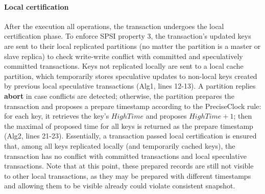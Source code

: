 \paragraph{Local certification} After the execution all operations, the transaction undergoes the local certification phase. To enforce SPSI property 3, the transaction's updated keys are sent to their local replicated partitions (no matter the partition is a master or slave replica) to check write-write conflict with committed and speculatively committed transactions. Keys not replicated locally are sent to a local cache partition, which temporarily stores speculative updates to non-local keys created by previous local speculative transactions (Alg1, lines 12-13). A partition replies \textbf{abort} in case conflicts are detected; otherwise, the partition prepares the transaction and proposes a prepare timestamp according to the PreciseClock rule: for each key, it retrieves the key's $HighTime$ and proposes $HighTime+1$; then the maximal of proposed time for all keys is returned as the prepare timestamp (Alg2, lines 21-23). Essentially, a transaction passed local certification is ensured that, among all keys replicated locally (and temporarily cached keys), the transaction has no conflict with committed transactions and local speculative transactions. Note that at this point, these prepared records are still not visible to other local transactions, as they may be prepared with different timestamps and allowing them to be visible already could violate consistent snapshot.

